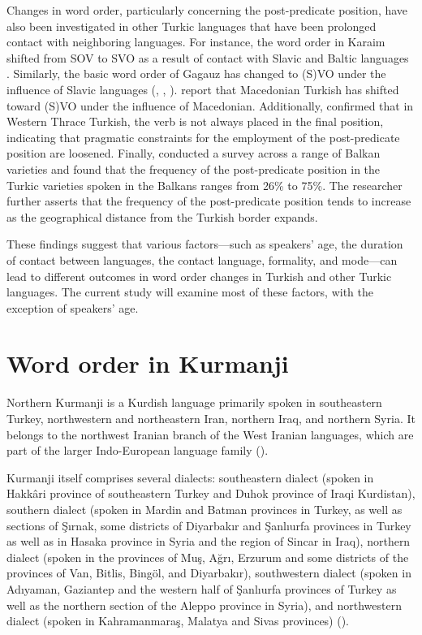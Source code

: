 Changes in word order, particularly concerning the post-predicate position, have also been investigated in other Turkic languages that have been prolonged contact with neighboring languages. For instance, the word order in Karaim shifted from SOV to SVO as a result of contact with Slavic and Baltic languages \citep{Csato2002}. Similarly, the basic word order of Gagauz has changed to (S)VO under the influence of Slavic languages (\citealt{Doerfer1959}, \citealt{Menz1999, Menz2014}, \citealt{Johanson2021}). \citet{Matras_grammatical_Tufan2007-1} report that Macedonian Turkish has shifted toward (S)VO under the influence of Macedonian. Additionally, \citet{Petrou2019} confirmed that in Western Thrace Turkish, the verb is not always placed in the final position, indicating that pragmatic constraints for the employment of the post-predicate position are loosened. Finally, \citet{Keskin2023} conducted a survey across a range of Balkan varieties and found that the frequency of the post-predicate position in the Turkic varieties spoken in the Balkans ranges from 26\% to 75\%. The researcher further asserts that the frequency of the post-predicate position tends to increase as the geographical distance from the Turkish border expands.

These findings suggest that various factors—such as speakers’ age, the duration of contact between languages, the contact language, formality, and mode—can lead to different outcomes in word order changes in Turkish and other Turkic languages. The current study will examine most of these factors, with the exception of speakers’ age.

\section{Word order in Kurmanji}\label{sec:key:3.3}

Northern Kurmanji is a Kurdish language primarily spoken in southeastern Turkey, northwestern and northeastern Iran, northern Iraq, and northern Syria. It belongs to the northwest Iranian branch of the West Iranian languages, which are part of the larger Indo-European language family (\citealt{HaigMatras2002}).

Kurmanji itself comprises several dialects: southeastern dialect (spoken in Hakkâri province of southeastern Turkey and Duhok province of Iraqi Kurdistan), southern dialect (spoken in Mardin and Batman provinces in Turkey, as well as sections of Şırnak, some districts of Diyarbakır and Şanlıurfa provinces in Turkey as well as in Hasaka province in Syria and the region of Sincar in Iraq), northern dialect (spoken in the provinces of Muş, Ağrı, Erzurum and some districts of the provinces of Van, Bitlis, Bingöl, and Diyarbakır), southwestern dialect (spoken in Adıyaman, Gaziantep and the western half of Şanlıurfa provinces of Turkey as well as the northern section of the Aleppo province in Syria), and northwestern dialect (spoken in Kahramanmaraş, Malatya and Sivas provinces) (\citealt{OpenginHaig2014}).

